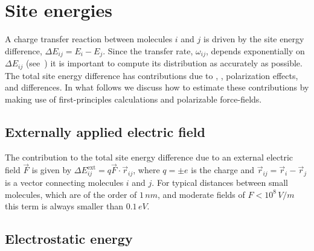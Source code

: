 \section{Site energies}
\label{sec:site_energies}
A charge transfer reaction between molecules $i$ and $j$ is driven by the site energy difference, $\Delta E_{ij} = E_i - E_j$. Since the  transfer rate, $\omega_{ij}$, depends exponentially on $\Delta E_{ij}$ (see~) it is important to compute its distribution as accurately as possible.  The total site energy difference has contributions due to , , polarization effects, and  differences. In what follows we discuss how to estimate these contributions by making use of first-principles calculations and polarizable force-fields.

\subsection{Externally applied electric field}
\label{sec:ext_field}
The contribution to the total site energy difference due to an external electric field $\vec{F}$ is given by $\Delta E_{ij}^\text{ext} = q {\vec{F} \cdot \vec{r}_{ij}}$, where $q=\pm e$ is the charge and $\vec{r}_{ij} = \vec{r}_i  - \vec{r}_j $ is a vector connecting molecules $i$ and $j$. For typical distances between small molecules, which are of the order  of $1\,\unit{nm}$, and moderate fields of $F<10^8\,\unit{V/m}$ this term is always smaller than $0.1\, \unit{eV}$.

\subsection{Electrostatic energy}
\label{sec:ecoulomb}

